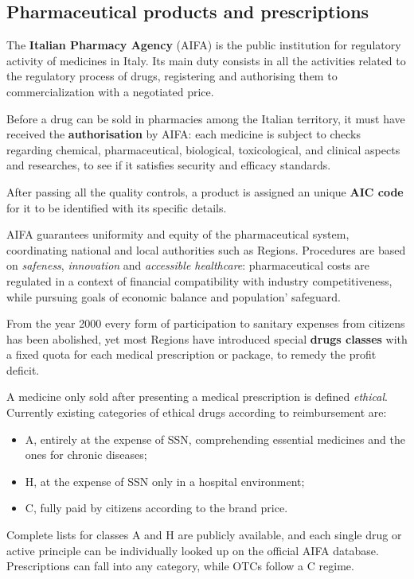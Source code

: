 \subsection{Pharmaceutical products and prescriptions}  
The \textbf{Italian Pharmacy Agency} (AIFA) is the public institution for regulatory activity of medicines in Italy. Its main duty consists in all the activities related to the regulatory process of drugs, registering and authorising them to commercialization with a negotiated price. 

Before a drug can be sold in pharmacies among the Italian territory, it must have received the \textbf{authorisation} by AIFA: each medicine is subject to checks regarding chemical, pharmaceutical, biological, toxicological, and clinical aspects and researches, to see if it satisfies security and efficacy standards\cite{aic}.

After passing all the quality controls, a product is assigned an unique \textbf{AIC code} for it to be identified with its specific details.

AIFA guarantees uniformity and equity of the pharmaceutical system, coordinating national and local authorities such as Regions. Procedures are based on \textit{safeness}, \textit{innovation} and \textit{accessible healthcare}: pharmaceutical costs are regulated in a context of financial compatibility with industry competitiveness, while pursuing goals of economic balance and population' safeguard.

From the year 2000 every form of participation to sanitary expenses from citizens has been abolished\cite{ticket}, yet most Regions have introduced special \textbf{drugs classes} with a fixed quota for each medical prescription or package, to remedy the profit deficit. 

A medicine only sold after presenting a medical prescription is defined \textit{ethical}. Currently existing categories of ethical drugs according to reimbursement are\cite{classi}:
\begin{itemize}
	\item A, entirely at the expense of SSN, comprehending essential medicines and the ones for chronic diseases;
	\item H, at the expense of SSN only in a hospital environment;
	\item C, fully paid by citizens according to the brand price.
\end{itemize}
Complete lists for classes A and H are publicly available, and each single drug or active principle can be individually looked up on the official AIFA database. Prescriptions can fall into any category, while OTCs follow a C regime. 

